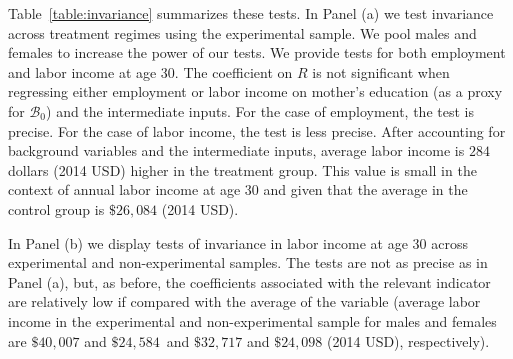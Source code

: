 Table~\ref{table:invariance} summarizes these tests. In Panel (a) we test invariance across treatment regimes using the experimental sample. We pool males and females to increase the power of our tests. We provide tests for both employment and labor income at age 30. The coefficient on $R$ is not significant when regressing either employment or labor income on mother's education (as a proxy for $\mathcal{B}_{0}$) and the intermediate inputs. For the case of employment, the test is precise. For the case of labor income, the test is less precise. After accounting for background variables and the intermediate inputs, average labor income is $284$ dollars (2014 USD) higher in the treatment group. This value is small in the context of annual labor income at age 30 and given that the average in the control group is $\$26,084$ (2014 USD).

In Panel (b) we display tests of invariance in labor income at age 30 across experimental and non-experimental samples. The tests are not as precise as in Panel (a), but, as before, the coefficients associated with the relevant indicator are relatively low if compared with the average of the variable (average labor income in the experimental and non-experimental sample for males and females are $\$40,007$ and $\$24,584$ \,and  $\$32,717$ and $\$24,098$ (2014 USD), respectively).\\

